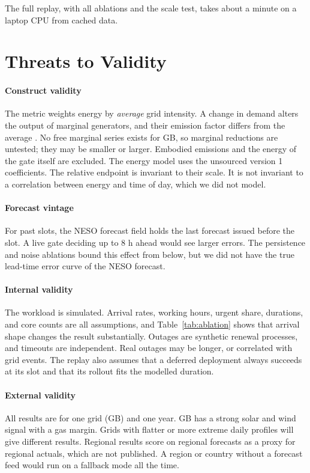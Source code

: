 \documentclass[journal]{IEEEtran}
\begin{document}
The full replay, with all ablations and the scale test, takes about a minute on a laptop CPU from cached data.

\section{Threats to Validity}
\label{sec:threats}
\paragraph{Construct validity} The metric weights energy by \emph{average} grid intensity. A change in demand alters the output of marginal generators, and their emission factor differs from the average \cite{siler2012marginal}. No free marginal series exists for GB, so marginal reductions are untested; they may be smaller or larger. Embodied emissions \cite{gupta2021chasing} and the energy of the gate itself are excluded. The energy model uses the unsourced version 1 coefficients. The relative endpoint is invariant to their scale. It is not invariant to a correlation between energy and time of day, which we did not model.

\paragraph{Forecast vintage} For past slots, the NESO forecast field holds the last forecast issued before the slot. A live gate deciding up to 8 h ahead would see larger errors. The persistence and noise ablations bound this effect from below, but we did not have the true lead-time error curve of the NESO forecast.

\paragraph{Internal validity} The workload is simulated. Arrival rates, working hours, urgent share, durations, and core counts are all assumptions, and Table~\ref{tab:ablation} shows that arrival shape changes the result substantially. Outages are synthetic renewal processes, and timeouts are independent. Real outages may be longer, or correlated with grid events. The replay also assumes that a deferred deployment always succeeds at its slot and that its rollout fits the modelled duration.

\paragraph{External validity} All results are for one grid (GB) and one year. GB has a strong solar and wind signal with a gas margin. Grids with flatter or more extreme daily profiles will give different results. Regional results score on regional forecasts as a proxy for regional actuals, which are not published. A region or country without a forecast feed would run on a fallback mode all the time.
\end{document}
